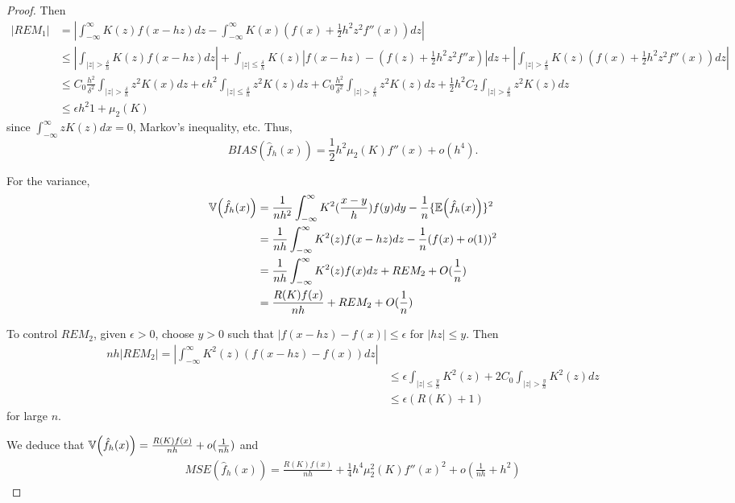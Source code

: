 \begin{proof}
Then
\begin{align}
  \label{eq:18}
  |REM_{1}| &= | \int_{-\infty}^{\infty} K(z) f(x - hz) dz -
  \int_{-\infty}^{\infty} K(x)(f(x) + \frac{1}{2} h^{2} z^{2} f''(x))
  dz | \\
  &\leq | \int_{|z| > \frac{\delta}{h}} K(z) f(x - hz) dz| +
  \int_{|z| \leq \frac{\delta}{h}} K(z)|f(x-hz) - (f(z) +
  \frac{1}{2}h^{2} z^{2} f''x)| dz + | \int_{|z| > \frac{\delta}{h}}
  K(z) (f(x) + \frac{1}{2} h^{2} z^{2} f''(x)) dz| \\
  &\leq C_{0} \frac{h^{2}}{\delta^{2}} \int_{|z| > \frac{\delta}{h}}
  z^{2} K(x) dz + \epsilon h^{2} \int_{|z| \leq \frac{\delta}{h}}
  z^{2} K(z) dz + C_{0} \frac{h^{2}}{\delta^{2}} \int_{|z| >
    \frac{\delta}{h}} z^{2} K(z) dz + \frac{1}{2} h^{2} C_{2}
  \int_{|z| > \frac{\delta}{h}} z^{2} K(z) dz \\
  &\leq \epsilon h^{2}{1 + \mu_{2}(K)}
\end{align}
since $\int_{-\infty}^{\infty} z K(z) dx = 0$, Markov's inequality, etc.
Thus,
\begin{equation}
  \label{eq:19}
  BIAS(\hat f_{h}(x)) = \frac{1}{2} h^{2} \mu_{2}(K) f''(x) + o(h^{4}).
\end{equation}

For the variance,
\begin{align}
  \label{eq:20}
  \Var{\hat f_{h}(x)} &= \frac{1}{nh^{2}} \int_{-\infty}^{\infty}
  K^{2}(\frac{x-y}{h}) f(y) dy - \frac{1}{n} \{\E{\hat f_{h}(x)}
  \}^{2} \\
  &= \frac{1}{nh} \int_{-\infty}^{\infty} K^{2}(z) f(x - hz) dz -
  \frac{1}{n} (f(x) + o(1))^{2} \\
  &= \frac{1}{nh} \int_{-\infty}^{\infty} K^{2}(z) f(x) dz + REM_{2} +
  O(\frac{1}{n}) \\
  &= \frac{R(K) f(x)}{nh} + REM_{2} + O(\frac{1}{n})
\end{align}

To control $REM_{2}$, given $\epsilon > 0$, choose $y > 0$ such that
$|f(x - hz) - f(x)| \leq \epsilon$ for $|hz| \leq y$.  Then
\begin{align}
  \label{eq:21}
  nh | REM_{2} | = | \int_{-\infty}^{\infty} K^{2}(z) (f(x - hz) -
  f(x)) dz | \\
  &\leq \epsilon \int_{|z| \leq \frac{y}{h}} K^{2}(z) + 2 C_{0}
  \int_{|z| > \frac{y}{h}} K^{2}(z) dz \\
  &\leq \epsilon(R(K) + 1)
\end{align}
for large $n$.

We deduce that $\Var{\hat f_{h}(x)} = \frac{R(K) f(x)}{nh} +
o(\frac{1}{nh})$ and
\begin{align}
  \label{eq:22}
  MSE( \hat f_{h}(x)) = \frac{R(K) f(x)}{nh} + \frac{1}{4} h^{4}
  \mu_{2}^{2}(K) f''(x)^{2} + o(\frac{1}{nh} + h^{2})
\end{align}


\end{proof}
